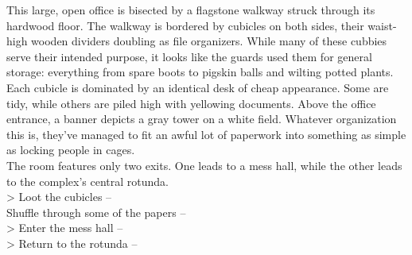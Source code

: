 This large, open office is bisected by a flagstone walkway struck through its hardwood floor. The walkway is bordered by cubicles on both sides, their waist-high wooden dividers doubling as file organizers. While many of these cubbies serve their intended purpose, it looks like the guards used them for general storage: everything from spare boots to pigskin balls and wilting potted plants.\\

Each cubicle is dominated by an identical desk of cheap appearance. Some are tidy, while others are piled high with yellowing documents. Above the office entrance, a banner depicts a gray tower on a white field. Whatever organization this is, they've managed to fit an awful lot of paperwork into something as simple as locking people in cages.\\

The room features only two exits. One leads to a mess hall, while the other leads to the complex's central rotunda.\\

> Loot the cubicles -- \\
 Shuffle through some of the papers -- \\
> Enter the mess hall -- \\
> Return to the rotunda -- 